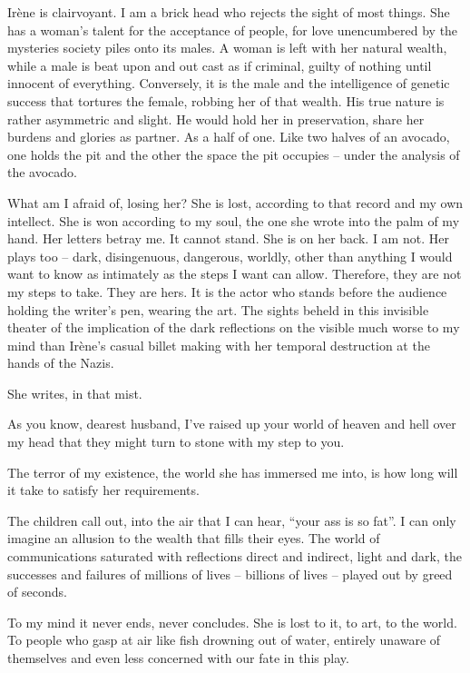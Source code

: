 

﻿Irène is clairvoyant.  I am a brick head who rejects the sight of most things.  She has a woman’s talent for the acceptance of people, for love unencumbered by the mysteries society piles onto its males.  A woman is left with her natural wealth, while a male is beat upon and out cast as if criminal, guilty of nothing until innocent of everything.  Conversely, it is the male and the intelligence of genetic success that tortures the female, robbing her of that wealth.  His true nature is rather asymmetric and slight.  He would hold her in preservation, share her burdens and glories as partner.  As a half of one.  Like two halves of an avocado, one holds the pit and the other the space the pit occupies -- under the analysis of the avocado.


What am I afraid of, losing her?  She is lost, according to that record and my own intellect.  She is won according to my soul, the one she wrote into the palm of my hand.  Her letters betray me.  It cannot stand.  She is on her back.  I am not.  Her plays too -- dark, disingenuous, dangerous, worldly, other than anything I would want to know as intimately as the steps I want can allow.  Therefore, they are not my steps to take.  They are hers.  It is the actor who stands before the audience holding the writer’s pen, wearing the art.  The sights beheld in this invisible theater of the implication of the dark reflections on the visible much worse to my mind than Irène’s casual billet making with her temporal destruction at the hands of the Nazis.


She writes, in that mist.


As you know, dearest husband, I’ve raised up your world of heaven and hell over my head that they might turn to stone with my step to you.


The terror of my existence, the world she has immersed me into, is how long will it take to satisfy her requirements.


The children call out, into the air that I can hear, “your ass is so fat”.  I can only imagine an allusion to the wealth that fills their eyes.  The world of communications saturated with reflections direct and indirect, light and dark, the successes and failures of millions of lives -- billions of lives -- played out by greed of seconds.


To my mind it never ends, never concludes.  She is lost to it, to art, to the world.  To people who gasp at air like fish drowning out of water, entirely unaware of themselves and even less concerned with our fate in this play.


